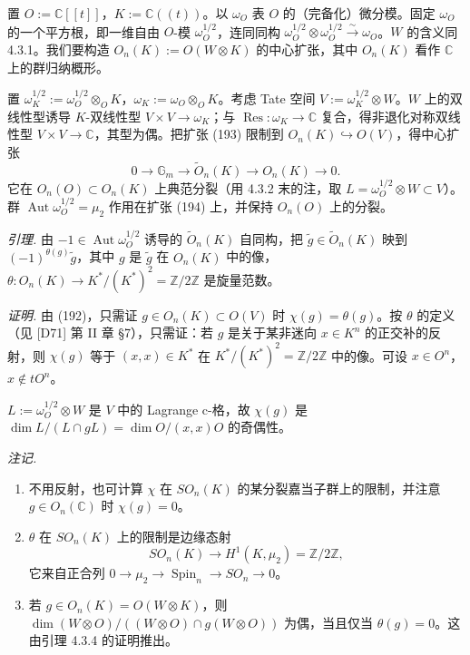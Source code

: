  置 $O:=\mathbb{C}[[t]]$，$K:=\mathbb{C}((t))$。以 $\omega_{O}$ 表 $O$ 的（完备化）微分模。固定 $\omega_{O}$ 的一个平方根，即一维自由 $O$-模 $\omega_{O}^{1/2}$，连同同构 $\omega_{O}^{1/2}\otimes\omega_{O}^{1/2}\xrightarrow{\ \sim\ }\omega_{O}$。$W$ 的含义同 4.3.1。我们要构造 $O_{n}(K):=O(W\otimes K)$ 的中心扩张，其中 $O_{n}(K)$ 看作 $\mathbb{C}$ 上的群归纳概形。

置 $\omega_{K}^{1/2}:=\omega_{O}^{1/2}\otimes_{O}K$，$\omega_{K}:=\omega_{O}\otimes_{O}K$。考虑 Tate 空间 $V:=\omega_{K}^{1/2}\otimes W$。$W$ 上的双线性型诱导 $K$-双线性型 $V\times V\to\omega_{K}$；与 $\operatorname{Res}:\omega_{K}\to\mathbb{C}$ 复合，得非退化对称双线性型 $V\times V\to\mathbb{C}$，其型为偶。把扩张 (193) 限制到 $O_{n}(K)\hookrightarrow O(V)$，得中心扩张
\begin{equation}\tag{194}
0\to\mathbb{G}_{m}\to\tilde{O}_{n}(K)\to O_{n}(K)\to 0.
\end{equation}
它在 $O_{n}(O)\subset O_{n}(K)$ 上典范分裂（用 4.3.2 末的注，取 $L=\omega_{O}^{1/2}\otimes W\subset V$）。群 $\operatorname{Aut}\omega_{O}^{1/2}=\mu_{2}$ 作用在扩张 (194) 上，并保持 $O_{n}(O)$ 上的分裂。

 \emph{引理.} 由 $-1\in\operatorname{Aut}\omega_{O}^{1/2}$ 诱导的 $\tilde{O}_{n}(K)$ 自同构，把 $\tilde{g}\in\tilde{O}_{n}(K)$ 映到 $(-1)^{\theta(g)}\tilde{g}$，其中 $g$ 是 $\tilde{g}$ 在 $O_{n}(K)$ 中的像，$\theta:O_{n}(K)\to K^{*}/(K^{*})^{2}=\mathbb{Z}/2\mathbb{Z}$ 是旋量范数。

\emph{证明.} 由 (192)，只需证 $g\in O_{n}(K)\subset O(V)$ 时 $\chi(g)=\theta(g)$。按 $\theta$ 的定义（见 [D71] 第 II 章 §7），只需证：若 $g$ 是关于某非迷向 $x\in K^{n}$ 的正交补的反射，则 $\chi(g)$ 等于 $(x,x)\in K^{*}$ 在 $K^{*}/(K^{*})^{2}=\mathbb{Z}/2\mathbb{Z}$ 中的像。可设 $x\in O^{n}$，$x\notin tO^{n}$。

$L:=\omega_{O}^{1/2}\otimes W$ 是 $V$ 中的 Lagrange c-格，故 $\chi(g)$ 是 $\dim L/(L\cap gL)=\dim O/(x,x)O$ 的奇偶性。

\emph{注记.}
\begin{enumerate}[label=(\roman*),leftmargin=2.2em]
\item 不用反射，也可计算 $\chi$ 在 $SO_{n}(K)$ 的某分裂嘉当子群上的限制，并注意 $g\in O_{n}(\mathbb{C})$ 时 $\chi(g)=0$。
\item $\theta$ 在 $SO_{n}(K)$ 上的限制是边缘态射
\begin{equation}\tag{195}
SO_{n}(K)\to H^{1}(K,\mu_{2})=\mathbb{Z}/2\mathbb{Z},
\end{equation}
它来自正合列 $0\to\mu_{2}\to\operatorname{Spin}_{n}\to SO_{n}\to 0$。
\item 若 $g\in O_{n}(K)=O(W\otimes K)$，则 $\dim(W\otimes O)/((W\otimes O)\cap g(W\otimes O))$ 为偶，当且仅当 $\theta(g)=0$。这由引理 4.3.4 的证明推出。
\end{enumerate}

